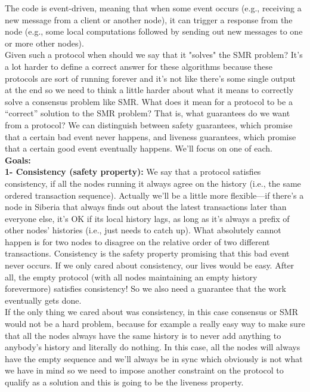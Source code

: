 The code is event-driven, meaning that when some event occurs (e.g., receiving a new message from a client or another node), it can trigger a response from the node (e.g., some local computations followed by sending out new messages to one or more other nodes).\\


Given such a protocol when should we say that it "solves" the SMR problem? It's a lot harder to define a correct answer for these algorithms because these protocols are sort of
running forever
and it's not like there's some single
output at the end so we need to think a
little harder about what it means to
correctly solve a consensus problem like SMR.
What does it mean for a protocol to be a “correct” solution to the SMR problem?
That is, what guarantees do we want from a protocol? We can distinguish between safety
guarantees, which promise that a certain bad event never happens, and liveness guarantees,
which promise that a certain good event eventually happens. We’ll focus on one of each.\\
\noindent
\textbf{Goals:}\\

\noindent
\textbf{1- Consistency (safety property):} We say that a protocol satisfies consistency, if all the nodes
running it always agree on the history (i.e., the same ordered transaction sequence). Actually
we’ll be a little more flexible—if there’s a node in Siberia that always finds out about the
latest transactions later than everyone else, it’s OK if its local history lags, as long as it’s
always a prefix of other nodes’ histories (i.e., just needs to catch up). What absolutely
cannot happen is for two nodes to disagree on the relative order of two different transactions.
Consistency is the safety property promising that this bad event never occurs.
If we only cared about consistency, our lives would be easy. After all, the empty protocol
(with all nodes maintaining an empty history forevermore) satisfies consistency! So we also need a guarantee that the work eventually gets done.\\

If the only thing we cared about was
consistency, in this case consensus or
SMR would not
be a hard problem,
because for example a really easy way to make
sure that all the nodes always have the
same history is to 
never add anything to anybody's history and 
literally do nothing. In this case, all the nodes
will always have the empty sequence and
we'll always be in sync which
obviously is not what we have in
mind so we need to impose another
constraint on the protocol to qualify as
a solution and this is going to be the
liveness property.\\

